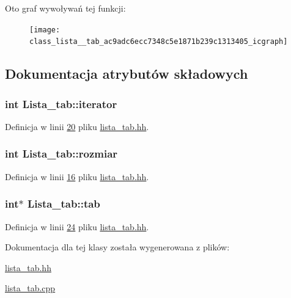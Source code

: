 Oto graf wywoływań tej funkcji\-:
\nopagebreak
\begin{figure}[H]
\begin{center}
\leavevmode
\texttt{[image: class\_lista\_\_tab\_ac9adc6ecc7348c5e1871b239c1313405\_icgraph]}
\end{center}
\end{figure}




\subsection{Dokumentacja atrybutów składowych}
\hypertarget{class_lista__tab_afd2c6ba3ae15e658890641b188c7ed39}{
\subsubsection[{iterator}]{\setlength{\rightskip}{0pt plus 5cm}int Lista\-\_\-tab\-::iterator}}\label{class_lista__tab_afd2c6ba3ae15e658890641b188c7ed39}


Definicja w linii \hyperlink{lista__tab_8hh_source_l00020}{20} pliku \hyperlink{lista__tab_8hh_source}{lista\-\_\-tab.\-hh}.

\hypertarget{class_lista__tab_a59e0425d896070457d1f3456b91842fd}{
\subsubsection[{rozmiar}]{\setlength{\rightskip}{0pt plus 5cm}int Lista\-\_\-tab\-::rozmiar}}\label{class_lista__tab_a59e0425d896070457d1f3456b91842fd}


Definicja w linii \hyperlink{lista__tab_8hh_source_l00016}{16} pliku \hyperlink{lista__tab_8hh_source}{lista\-\_\-tab.\-hh}.

\hypertarget{class_lista__tab_a123dfb670e5a5592e512c41cc4faf14e}{
\subsubsection[{tab}]{\setlength{\rightskip}{0pt plus 5cm}int$\ast$ Lista\-\_\-tab\-::tab}}\label{class_lista__tab_a123dfb670e5a5592e512c41cc4faf14e}


Definicja w linii \hyperlink{lista__tab_8hh_source_l00024}{24} pliku \hyperlink{lista__tab_8hh_source}{lista\-\_\-tab.\-hh}.



Dokumentacja dla tej klasy została wygenerowana z plików\-:\begin{DoxyCompactItemize}
\item 
\hyperlink{lista__tab_8hh}{lista\-\_\-tab.\-hh}\item 
\hyperlink{lista__tab_8cpp}{lista\-\_\-tab.\-cpp}\end{DoxyCompactItemize}
